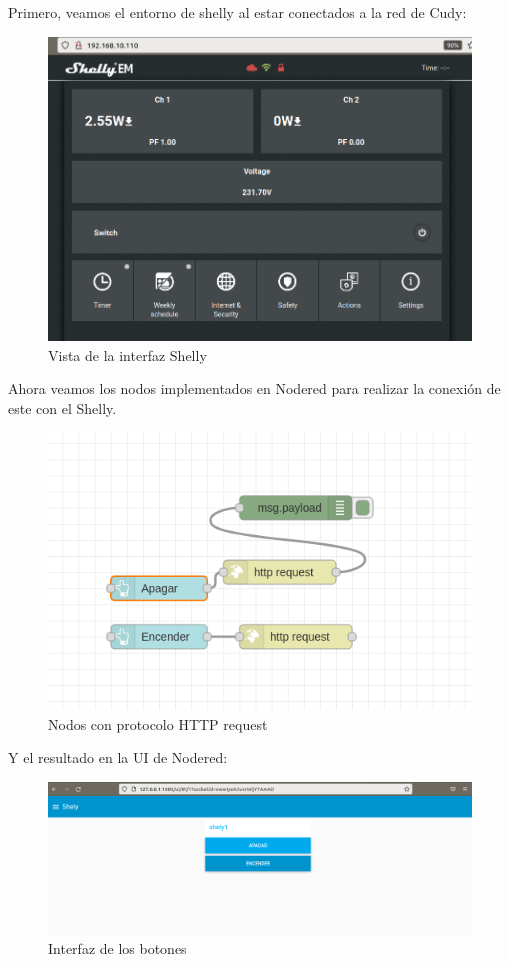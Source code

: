 \documentclass[12pt, a4paper]{article}
\begin{document}
Primero, veamos el entorno de shelly al estar conectados a la red de Cudy:

\begin{figure}[H]
    \centering
    \includegraphics[scale=0.4]{conexionaashely.png}
    \caption{Vista de la interfaz Shelly}
\end{figure}

Ahora veamos los nodos implementados en Nodered para realizar la conexión de este con el Shelly.

\begin{figure}[H]
    \centering
    \includegraphics[scale=0.5]{Botones_con_flow.png}
    \caption{Nodos con protocolo HTTP request}
\end{figure}

Y el resultado en la UI  de Nodered:

\begin{figure}[H]
    \centering
    \includegraphics[scale=0.3]{botones_ui_nodered.png}
    \caption{Interfaz de los botones}
\end{figure}
\end{document}
